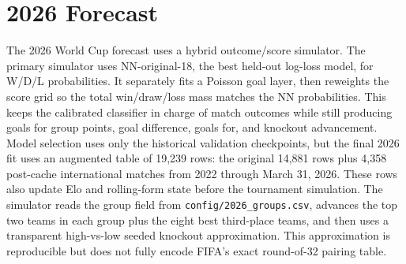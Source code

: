 \documentclass{article}
\begin{document}
\section{2026 Forecast}

The 2026 World Cup forecast uses a hybrid outcome/score simulator. The primary
simulator uses NN-original-18, the best held-out log-loss model, for W/D/L
probabilities. It separately fits a Poisson goal layer, then reweights the
score grid so the total win/draw/loss mass matches the NN probabilities. This
keeps the calibrated classifier in charge of match outcomes while still
producing goals for group points, goal difference, goals for, and knockout
advancement. Model selection uses only the historical
validation checkpoints, but the final 2026 fit uses an augmented table of
19,239 rows: the original 14,881 rows plus 4,358 post-cache international
matches from 2022 through March 31, 2026. These rows also update Elo and
rolling-form state before the tournament simulation. The simulator reads the
group field from \texttt{config/2026\_groups.csv}, advances the top two teams
in each group plus the eight best third-place teams, and then uses a
transparent high-vs-low seeded knockout approximation. This approximation is
reproducible but does not fully encode FIFA's exact round-of-32 pairing table.
\end{document}
